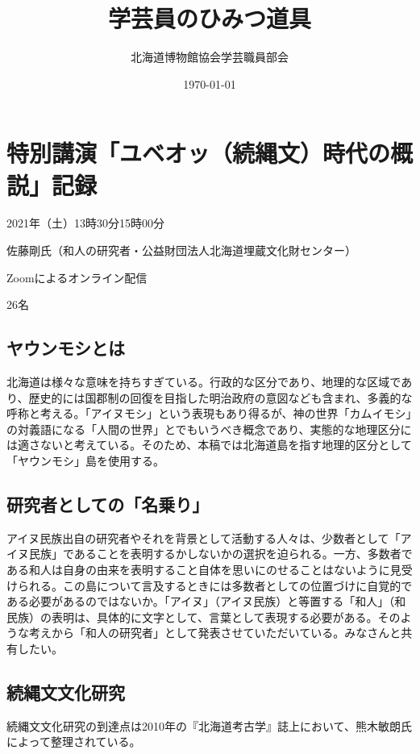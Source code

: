 \documentclass[a4j,11pt,twocolumn,openany]{jsbook}
\title{学芸員のひみつ道具}%
\date{\today}
\author{北海道博物館協会学芸職員部会}              %
\begin{document}
\frontmatter %

\tableofcontents

\mainmatter
\chapter{特別講演「ユベオッ（続縄文）時代の概説」記録}

\begin{description}	[leftmargin=3.5zw] %
\item[日　時]2021年（土）13時30分15時00分
\item[発表者]佐藤剛氏（和人の研究者・公益財団法人北海道埋蔵文化財センター）
\item[公開方法]Zoomによるオンライン配信
\item[参加者]26名
\end{description}

\section{ヤウンモシとは}
北海道は様々な意味を持ちすぎている。行政的な区分であり、地理的な区域であり、歴史的には国郡制の回復を目指した明治政府の意図なども含まれ、多義的な呼称と考える。「アイヌモシ」という表現もあり得るが、神の世界「カムイモシ」の対義語になる「人間の世界」とでもいうべき概念であり、実態的な地理区分には適さないと考えている。そのため、本稿では北海道島を指す地理的区分として「ヤウンモシ」島を使用する。

\section{研究者としての「名乗り」}
アイヌ民族出自の研究者やそれを背景として活動する人々は、少数者として「アイヌ民族」であることを表明するかしないかの選択を迫られる。一方、多数者である和人は自身の由来を表明すること自体を思いにのせることはないように見受けられる。この島について言及するときには多数者としての位置づけに自覚的である必要があるのではないか。「アイヌ」（アイヌ民族）と等置する「和人」（和民族）の表明は、具体的に文字として、言葉として表現する必要がある。そのような考えから「和人の研究者」として発表させていただいている。みなさんと共有したい。

\section{続縄文文化研究}
続縄文文化研究の到達点は2010年の『北海道考古学』誌上において、熊木敏朗氏によって整理されている。
\end{document}
